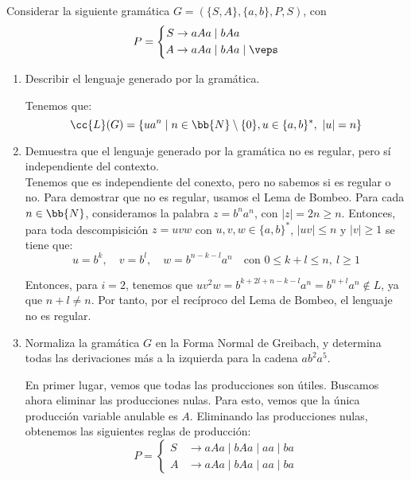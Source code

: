 \begin{ejercicio}\label{ej:1.4.10}
    Considerar la siguiente gramática $G=(\{ S, A \}, \{ a, b \}, P, S)$, con
    \begin{equation*}
        P = \left\{
            \begin{aligned}
                S &\rightarrow aAa \mid bAa\\
                A &\rightarrow aAa \mid bAa \mid \veps
            \end{aligned}
        \right.
    \end{equation*}
    \begin{enumerate}
        \item Describir el lenguaje generado por la gramática.
        
        Tenemos que:
        \begin{equation*}
            \cc{L}(G)=\{ua^n\mid n\in\bb{N}\setminus \{0\}, u\in \{a,b\}^*,~|u|=n\}
        \end{equation*}
        \item Demuestra que el lenguaje generado por la gramática no es regular, pero sí independiente del contexto.\\
        
        Tenemos que es independiente del conexto, pero no sabemos si es regular o no. Para demostrar que no es regular, usamos el Lema de Bombeo.
        Para cada $n\in \bb{N}$, consideramos la palabra $z=b^{n}a^{n}$, con $|z|=2n\geq n$. Entonces, para toda descompisición $z=uvw$ con $u,v,w\in \{a,b\}^*$, $|uv|\leq n$ y $|v|\geq 1$ se tiene que:
        \begin{equation*}
            u=b^k,\quad v=b^l,\quad w=b^{n-k-l}a^{n} \quad \text{con } 0\leq k+l\leq n,~l\geq 1
        \end{equation*}

        Entonces, para $i=2$, tenemos que $uv^2w=b^{k+2l+n-k-l}a^{n}=b^{n+l}a^{n}\notin L$, ya que $n+l\neq n$. Por tanto, por el recíproco del Lema de Bombeo, el lenguaje no es regular.
        \item Normaliza la gramática $G$ en la Forma Normal de Greibach, y determina todas las derivaciones más a la izquierda para la cadena $ab^2a^5$.
        
        En primer lugar, vemos que todas las producciones son útiles. Buscamos ahora eliminar las producciones nulas. Para esto, vemos que la única producción variable anulable es $A$. Eliminando las producciones nulas, obtenemos las siguientes reglas de producción:
        \begin{equation*}
            P = \left\{
                \begin{aligned}
                    S &\rightarrow aAa \mid bAa \mid aa \mid ba\\
                    A &\rightarrow aAa \mid bAa \mid aa \mid ba
                \end{aligned}
            \right.
        \end{equation*}


\end{enumerate}
\end{ejercicio}
